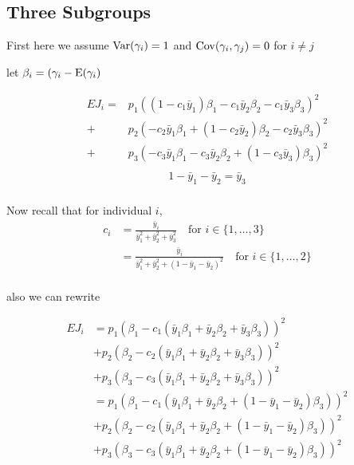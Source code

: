 
\subsection*{Three Subgroups}

First here we assume $\mathrm{Var}(\gamma_i) = 1$ and $\mathrm{Cov}(\gamma_i, \gamma_j) = 0$ for $i \neq j$

let $\beta_i = (\gamma_i - \mathrm{E}(\gamma_i)$

\begin{align*}
	E J_i = &p_1 ( (1 - c_1 \bar{y}_1) \beta_1 - c_1 \bar{y}_2 \beta_2 - c_1 \bar{y}_3 \beta_3 )^2 \\
		  + &p_2 ( - c_2 \bar{y}_1 \beta_1 + (1 - c_2 \bar{y}_2) \beta_2  - c_2 \bar{y}_3 \beta_3 )^2 \\
		  + &p_3 ( - c_3 \bar{y}_1 \beta_1 - c_3 \bar{y}_2 \beta_2 + (1 - c_3 \bar{y}_3) \beta_3 )^2 \\
\end{align*}
 \begin{align*}
	1 - \bar{y}_1 - \bar{y}_2 = \bar{y}_3 \\
\end{align*}


Now recall that for individual $i$,
\begin{align*}
	c_i &= \frac{\bar{y}_i}{\bar{y}_1^2 + \bar{y}_2^2 + \bar{y}_3^2} \quad \text{for $i \in \{1,\ldots,3\}$} \\
		&= \frac{\bar{y}_i}{\bar{y}_1^2 + \bar{y}_2^2 + (1 - \bar{y}_1 - \bar{y}_2 )^2} \quad \text{for $i \in \{1,\ldots,2\}$} \\
\end{align*}


also we can rewrite

\begin{align*}
	E J_i &= p_1 ( \beta_1 - c_1 (\bar{y}_1 \beta_1 + \bar{y}_2 \beta_2 + \bar{y}_3 \beta_3 ))^2 \\
		  &+ p_2 ( \beta_2 - c_2 (\bar{y}_1 \beta_1 +  \bar{y}_2 \beta_2 + \bar{y}_3 \beta_3 ))^2 \\
		  &+ p_3 ( \beta_3 - c_3 (\bar{y}_1 \beta_1 +\bar{y}_2 \beta_2 + \bar{y}_3 \beta_3 ))^2 \\
		  &= p_1 ( \beta_1 - c_1 (\bar{y}_1 \beta_1 + \bar{y}_2 \beta_2 + (1 - \bar{y}_1 - \bar{y}_2) \beta_3 ))^2 \\
		  &+ p_2 ( \beta_2 - c_2 (\bar{y}_1 \beta_1 +  \bar{y}_2 \beta_2 + (1 - \bar{y}_1 - \bar{y}_2) \beta_3 ))^2 \\
		  &+ p_3 ( \beta_3 - c_3 (\bar{y}_1 \beta_1 +\bar{y}_2 \beta_2 + (1 - \bar{y}_1 - \bar{y}_2) \beta_3 ))^2 \\
\end{align*}

